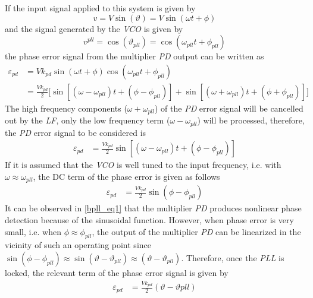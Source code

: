\documentclass[11pt,a4paper,oneside]{book}
\numberwithin{equation}{section}
\theoremstyle{it}
\theoremstyle{definition}
\begin{document}
If the input signal applied to this system is given by
\begin{equation}
	v=V\sin(\vartheta) = V\sin(\omega t + \phi)
\end{equation} 
and the signal generated by the \textit{VCO} is given by
\begin{equation}
	v^{pll}=\cos(\vartheta_{pll})=\cos(\omega_{pll}t+\phi_{pll})
\end{equation}
the phase error signal from the multiplier \textit{PD} output can be written as
\begin{equation}
	\begin{aligned}
		\varepsilon_{pd} &= Vk_{pd} \sin(\omega t +\phi)\cos(\omega_{pll}t+\phi_{pll}) \\[6pt]
		&= \frac{Vk_{pd}}{2}\Big[\sin[(\omega-\omega_{pll})t+(\phi-\phi_{pll})]+\sin[(\omega+\omega_{pll})t+(\phi+\phi_{pll})]\Big]
	\end{aligned}
\end{equation}
The high frequency components ($\omega+\omega_{pll}$) of the \textit{PD} error signal will be cancelled out by the \textit{LF}, only the low frequency term ($\omega-\omega_{pll}$) will be processed, therefore, the \textit{PD} error signal to be considered is
\begin{equation}
		\begin{aligned}
			\varepsilon_{pd} &=  \frac{Vk_{pd}}{2}\sin[(\omega-\omega_{pll})t+(\phi-\phi_{pll})]
		\end{aligned}
\end{equation}
If it is assumed that the \textit{VCO} is well tuned to the input frequency, i.e. with $\omega\approx\omega_{pll}$, the DC term of the phase error is given as follows
\begin{equation}
	\begin{aligned}\label{bpll_eq1}
		\varepsilon_{pd} &=  \frac{Vk_{pd}}{2}\sin(\phi-\phi_{pll})
	\end{aligned}
\end{equation}
It can be observed in \eqref{bpll_eq1} that the multiplier \textit{PD} produces nonlinear phase detection because of the sinusoidal function. However, when phase error is very small, i.e. when $\phi\approx\phi_{pll}$, the output of the multiplier \textit{PD} can be linearized in the vicinity of such an operating point since $\sin(\phi-\phi_{pll})\approx\sin(\vartheta-\vartheta_{pll})\approx(\vartheta-\vartheta_{pll})$. Therefore, once the \textit{PLL} is locked, the relevant term of the phase error signal is given by
 \begin{equation}
 	\begin{aligned}\label{bpll_eq2}
 		\varepsilon_{pd} &=  \frac{Vk_{pd}}{2}(\vartheta-\vartheta{pll})
 	\end{aligned}
 \end{equation}
\end{document}
